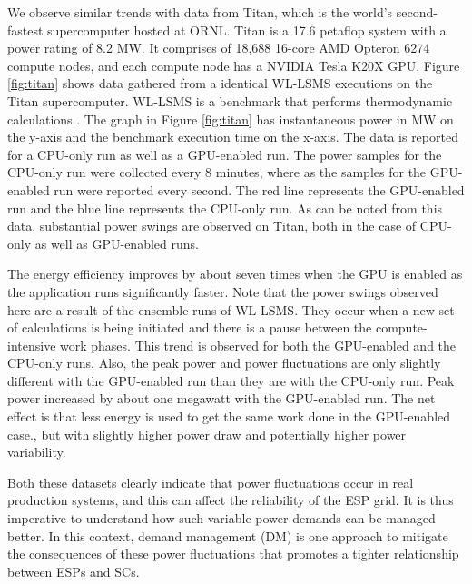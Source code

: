 We observe similar trends with data from Titan, which is the world's second-fastest supercomputer hosted at ORNL. Titan is a 17.6 petaflop system with a power rating of 8.2 MW. It comprises of 18,688 16-core AMD Opteron 6274 compute nodes, and each compute node has a NVIDIA Tesla K20X GPU. Figure \ref{fig:titan} shows data gathered from a identical WL-LSMS executions on the Titan supercomputer. WL-LSMS is a benchmark that performs thermodynamic calculations  \cite{WLLSMS}. The graph in Figure \ref{fig:titan} has instantaneous power in MW on the y-axis and the benchmark execution time on the x-axis. The data is reported for a CPU-only run as well as a GPU-enabled run. The power samples for the CPU-only run were collected every 8 minutes, where as the samples for the GPU-enabled run were reported every second. The red line represents the GPU-enabled run and the blue line represents the CPU-only run.  As can be noted from this data, substantial power swings are observed on Titan, both in the case of CPU-only as well as GPU-enabled runs. 

The energy efficiency improves by about seven times when the GPU is enabled as the application runs significantly faster. Note that the power swings observed here are a result of the ensemble runs of WL-LSMS. They occur when a new set of calculations is being initiated and there is a pause between the compute-intensive work phases. This trend is observed for both the GPU-enabled and the CPU-only runs. Also, the peak power and power fluctuations are only slightly different with the GPU-enabled run than they are with the CPU-only run. Peak power increased by about one megawatt with the GPU-enabled run. The net effect is that less energy is used to get the same work done in the GPU-enabled case., but with slightly higher power draw and potentially higher power variability.

Both these datasets clearly indicate that power fluctuations occur in real production systems, and this can affect the reliability of the ESP grid. It is thus imperative to understand how such variable power demands can be managed better. In this context, demand management (DM) is one approach to mitigate the consequences of these power fluctuations that promotes a tighter relationship between ESPs and SCs. %

